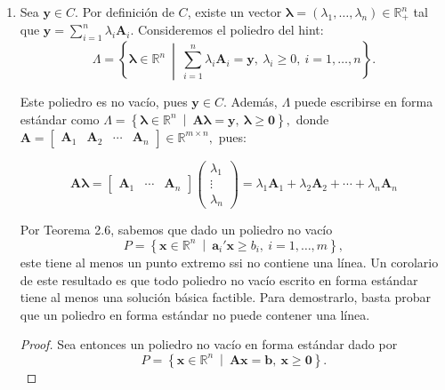 \begin{enumerate}

\item[(a)]
Sea $\mathbf{y} \in C$. Por definición de $C$, existe un vector $\boldsymbol{\lambda} = (\lambda_1,\ldots,\lambda_n) \in \mathbb{R}^n_+$ tal que $\mathbf{y} = \sum_{i=1}^{n} \lambda_i \mathbf{A}_i.$ Consideremos el poliedro del hint:
\begin{equation}
\Lambda =
\left\{
\boldsymbol{\lambda} \in \mathbb{R}^n
\ \middle|\
\sum_{i=1}^{n} \lambda_i \mathbf{A}_i = \mathbf{y},
\ \lambda_i \geq 0,\ i=1,\ldots,n
\right\}.
\end{equation}

Este poliedro es no vacío, pues $\mathbf{y} \in C$. Además, $\Lambda$ puede escribirse en forma estándar como $\Lambda =
\left\{
 \boldsymbol{\lambda} \in \mathbb{R}^n
\ \middle|\
\mathbf{A}\boldsymbol{\lambda} = \mathbf{y},
 \ \boldsymbol{\lambda} \geq \mathbf{0}
\right\},$ donde 
$\mathbf{A} =
\begin{bmatrix}
    \mathbf{A}_1 & \mathbf{A}_2 & \cdots & \mathbf{A}_n
\end{bmatrix}
\in \mathbb{R}^{m \times n},$ pues:

\begin{equation}
\mathbf{A}\boldsymbol{\lambda}
=
\begin{bmatrix} \mathbf{A}_1 & \cdots & \mathbf{A}_n \end{bmatrix}
\begin{pmatrix} \lambda_1 \\ \vdots \\ \lambda_n \end{pmatrix}
=
\lambda_1 \mathbf{A}_1 + \lambda_2 \mathbf{A}_2 + \cdots + \lambda_n \mathbf{A}_n
\end{equation}

Por Teorema 2.6, sabemos que dado un poliedro no vacío
\begin{equation}
    P =
    \left\{
    \mathbf{x} \in \mathbb{R}^n
    \ \middle|\
    \mathbf{a}_i' \mathbf{x} \geq b_i,\ i = 1,\ldots,m
    \right\},
\end{equation}
este tiene al menos un punto extremo ssi no contiene una línea. Un corolario de este resultado es que todo poliedro no vacío escrito en forma estándar tiene al menos una solución básica factible. Para demostrarlo, basta probar que un poliedro en forma estándar no puede contener una línea.
  
\begin{proof}
Sea entonces un poliedro no vacío en forma estándar dado por
\begin{equation}
    P =
    \left\{
    \mathbf{x} \in \mathbb{R}^n
    \ \middle|\
    \mathbf{A}\mathbf{x} = \mathbf{b},\ \mathbf{x} \geq \mathbf{0}
    \right\}.
\end{equation}


\end{proof}
\end{enumerate}
